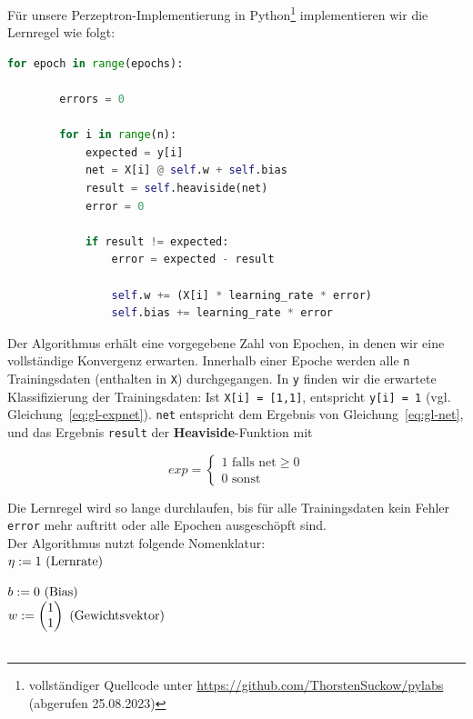 \pagebreak
Für unsere Perzeptron-Implementierung in Python\footnote{
    vollständiger Quellcode unter \url{https://github.com/ThorstenSuckow/pylabs} (abgerufen 25.08.2023)
} implementieren wir die Lernregel wie folgt:


\begin{lstlisting}[language=Python]
    for epoch in range(epochs):

        errors = 0

        for i in range(n):
            expected = y[i]
            net = X[i] @ self.w + self.bias
            result = self.heaviside(net)
            error = 0

            if result != expected:
                error = expected - result

                self.w += (X[i] * learning_rate * error)
                self.bias += learning_rate * error
\end{lstlisting}

\noindent
Der Algorithmus erhält eine vorgegebene Zahl von Epochen, in denen wir eine vollständige Konvergenz erwarten.
Innerhalb einer Epoche werden alle \verb|n| Trainingsdaten (enthalten in \verb|X|) durchgegangen.
In \verb|y| finden wir die erwartete Klassifizierung der Trainingsdaten:
Ist \verb|X[i] = [1,1]|, entspricht \verb|y[i] = 1| (vgl. Gleichung~\ref{eq:gl-expnet}).
\verb|net| entspricht dem Ergebnis von Gleichung~\ref{eq:gl-net}, und das Ergebnis \verb|result| der \textbf{Heaviside}-Funktion mit

\begin{equation}
    exp = \begin{cases}
              1 \text{ falls } \text{net} \geq 0 \\
              0 \text{ sonst}
    \end{cases}
    \label{eq:gl-expnet}
\end{equation}

\noindent
Die Lernregel wird so lange durchlaufen, bis für alle Trainingsdaten kein Fehler \verb|error| mehr auftritt oder alle Epochen ausgeschöpft sind.\\

\noindent
Der Algorithmus nutzt folgende Nomenklatur:\\


$\eta := 1 \space \space \text{ (Lernrate)}$

$b := 0 \space \space \text{ (Bias)}$\\

$w := \begin{pmatrix}
          1 \\
          1
\end{pmatrix}\space \space \text{ (Gewichtsvektor)}$
\\
\\

